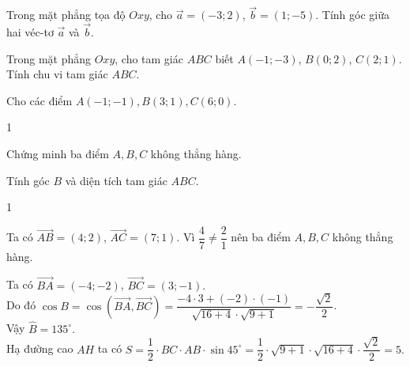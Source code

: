 \begin{bt}%
		Trong mặt phẳng tọa độ $Oxy$, cho $\overrightarrow{a}=(-3;2)$, $\overrightarrow{b}=(1;-5)$. Tính góc giữa hai véc-tơ $\overrightarrow{a}$ và $\overrightarrow{b}$.
	\end{bt}

\begin{bt}%
Trong mặt phẳng $Oxy$, cho tam giác $ABC$ biết $A(-1;-3)$, $B(0;2)$, $C(2;1)$. Tính chu vi tam giác $ABC$.	
\end{bt}

\begin{bt}%
	Cho các điểm $A(-1;-1), B(3;1), C(6;0).$
	\begin{enumEX}{1}
		\item Chứng minh ba điểm $A , B , C$ không thẳng hàng.
		\item Tính góc $B$ và diện tích tam giác $ABC$.
	\end{enumEX}
	\loigiai
	{
		\begin{enumEX}{1}
			\item Ta có $\overrightarrow{AB}=(4;2)$, $\overrightarrow{AC}=(7;1)$. Vì $\dfrac{4}{7}\neq \dfrac{2}{1}$ nên ba điểm $A, B, C$ không thẳng hàng.
			\item Ta có $\overrightarrow{BA}=(-4;-2)$, $\overrightarrow{BC}=(3;-1).$\\
			Do đó $\cos B=\cos(\overrightarrow{BA},\overrightarrow{BC})=\dfrac{-4\cdot 3+(-2)\cdot (-1)}{\sqrt{16+4}\cdot \sqrt{9+1}}=-\dfrac{\sqrt{2}}{2}$.\\
			Vậy $\widehat{B}=135^\circ.$\\
			Hạ đường cao $AH$ ta có $S=\dfrac{1}{2}\cdot BC\cdot AB\cdot \sin45^\circ=\dfrac{1}{2}\cdot \sqrt{9+1}\cdot \sqrt{16+4}\cdot \dfrac{\sqrt{2}}{2}=5.$
		\end{enumEX}
	}
\end{bt}

